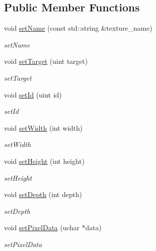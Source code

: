 \subsection*{Public Member Functions}
\begin{DoxyCompactItemize}
\item 
void \hyperlink{classEngine_1_1Texture_a935c4a83e0c4bcb4ff6bf3e73a2fcab8}{set\+Name} (const std\+::string \&texture\+\_\+name)
\begin{DoxyCompactList}\small\item\em set\+Name \end{DoxyCompactList}\item 
void \hyperlink{classEngine_1_1Texture_ad3dc7efa69aa3de1991eb5ee356b7eab}{set\+Target} (uint target)
\begin{DoxyCompactList}\small\item\em set\+Target \end{DoxyCompactList}\item 
void \hyperlink{classEngine_1_1Texture_acd3ea5dad0279a8bab6154de6588a2e4}{set\+Id} (uint id)
\begin{DoxyCompactList}\small\item\em set\+Id \end{DoxyCompactList}\item 
void \hyperlink{classEngine_1_1Texture_a52ea6825bd24b11875a37f0715e7b883}{set\+Width} (int width)
\begin{DoxyCompactList}\small\item\em set\+Width \end{DoxyCompactList}\item 
void \hyperlink{classEngine_1_1Texture_a1945ff1d8c22a3760dadada8b95d065d}{set\+Height} (int height)
\begin{DoxyCompactList}\small\item\em set\+Height \end{DoxyCompactList}\item 
void \hyperlink{classEngine_1_1Texture_aae0867e9f935f805f6bcb1c19327ce20}{set\+Depth} (int depth)
\begin{DoxyCompactList}\small\item\em set\+Depth \end{DoxyCompactList}\item 
void \hyperlink{classEngine_1_1Texture_a0a9392153530f674eae2cfd7590458f1}{set\+Pixel\+Data} (uchar $\ast$data)
\begin{DoxyCompactList}\small\item\em set\+Pixel\+Data \end{DoxyCompactList}\item 

\end{DoxyCompactItemize}
